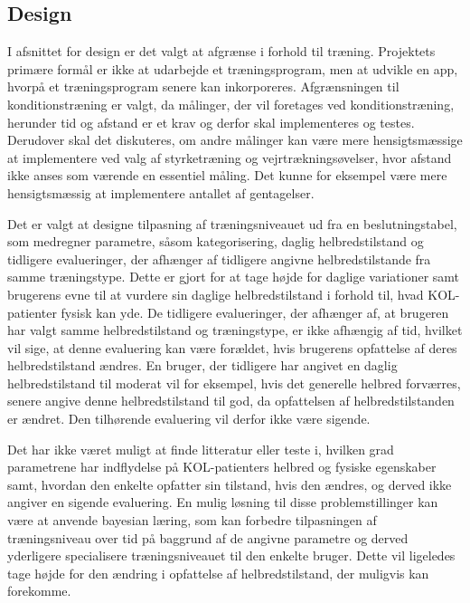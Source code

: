 \subsection{Design}
I afsnittet for design er det valgt at afgrænse i forhold til træning. Projektets primære formål er ikke at udarbejde et træningsprogram, men at udvikle en app, hvorpå et træningsprogram senere kan inkorporeres. Afgrænsningen til konditionstræning er valgt, da målinger, der vil foretages ved konditionstræning, herunder tid og afstand er et krav og derfor skal implementeres og testes. Derudover skal det diskuteres, om andre målinger kan være mere hensigtsmæssige at implementere ved valg af styrketræning og vejrtrækningsøvelser, hvor afstand ikke anses som værende en essentiel måling. Det kunne for eksempel være mere hensigtsmæssig at implementere antallet af gentagelser. 

Det er valgt at designe tilpasning af træningsniveauet ud fra en beslutningstabel, som medregner parametre, såsom kategorisering, daglig helbredstilstand og tidligere evalueringer, der afhænger af tidligere angivne helbredstilstande fra samme træningstype. Dette er gjort for at tage højde for daglige variationer samt brugerens evne til at vurdere sin daglige helbredstilstand i forhold til, hvad KOL-patienter fysisk kan yde. De tidligere evalueringer, der afhænger af, at brugeren har valgt samme helbredstilstand og træningstype, er ikke afhængig af tid, hvilket vil sige, at denne evaluering kan være forældet, hvis brugerens opfattelse af deres helbredstilstand ændres. En bruger, der tidligere har angivet en daglig helbredstilstand til moderat vil for eksempel, hvis det generelle helbred forværres, senere angive denne helbredstilstand til god, da opfattelsen af helbredstilstanden er ændret. Den tilhørende evaluering vil derfor ikke være sigende. 

Det har ikke været muligt at finde litteratur eller teste i, hvilken grad parametrene har indflydelse på KOL-patienters helbred og fysiske egenskaber samt, hvordan den enkelte opfatter sin tilstand, hvis den ændres, og derved ikke angiver en sigende evaluering. En mulig løsning til disse problemstillinger kan være at anvende bayesian læring, som kan forbedre tilpasningen af træningsniveau over tid på baggrund af de angivne parametre og derved yderligere specialisere træningsniveauet til den enkelte bruger. Dette vil ligeledes tage højde for den ændring i opfattelse af helbredstilstand, der muligvis kan forekomme.


